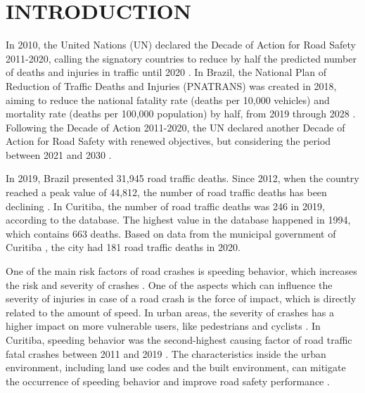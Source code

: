 

\chapter[INTRODUCTION]{INTRODUCTION} \label{cap:intro}






In 2010, the United Nations (UN) declared the Decade of Action for Road Safety 2011-2020, calling the signatory countries to reduce by half the predicted number of deaths and injuries in traffic until 2020 \cite{WHO2011}. In Brazil, the National Plan of Reduction of Traffic Deaths and Injuries (PNATRANS) was created in 2018, aiming to reduce the national fatality rate (deaths per 10,000 vehicles) and mortality rate (deaths per 100,000 population) by half, from 2019 through 2028 \cite{MinistryofCities2018}. Following the Decade of Action 2011-2020, the UN declared another Decade of Action for Road Safety with renewed objectives, but considering the period between 2021 and 2030 \cite{WHO2020}.


In 2019, Brazil presented 31,945 road traffic deaths. Since 2012, when the country reached a peak value of 44,812, the number of road traffic deaths has been declining \cite{MinistryofHealth2020}. In Curitiba, the number of road traffic deaths was 246 in 2019, according to the \textcite{MinistryofHealth2020} database. The highest value in the database happened in 1994, which contains 663 deaths. Based on data from the municipal government of Curitiba \cite{Curitiba2021}, the city had 181 road traffic deaths in 2020. 

One of the main risk factors of road crashes is speeding behavior, which increases the risk and severity of crashes \cite{Mohan2016}. One of the aspects which can influence the severity of injuries in case of a road crash is the force of impact, which is directly related to the amount of speed. In urban areas, the severity of crashes has a higher impact on more vulnerable users, like pedestrians and cyclists \cite{Welle2016}. In Curitiba, speeding behavior was the second-highest causing factor of road traffic fatal crashes between 2011 and 2019 \cite{Curitiba2020}. The characteristics inside the urban environment, including land use codes and the built environment, can mitigate the occurrence of speeding behavior and improve road safety performance \cite{Knoflacher2016}. 

